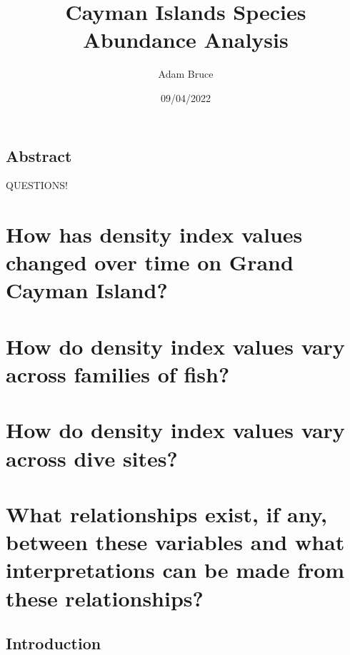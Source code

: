 \documentclass[
]{article}
\title{Cayman Islands Species Abundance Analysis}
\author{Adam Bruce}
\date{09/04/2022}
\begin{document}
\maketitle

\hypertarget{abstract}{%
\subsection{Abstract}\label{abstract}}

QUESTIONS!

\hypertarget{how-has-density-index-values-changed-over-time-on-grand-cayman-island}{%
\section{How has density index values changed over time on Grand Cayman
Island?}\label{how-has-density-index-values-changed-over-time-on-grand-cayman-island}}

\hypertarget{how-do-density-index-values-vary-across-families-of-fish}{%
\section{How do density index values vary across families of
fish?}\label{how-do-density-index-values-vary-across-families-of-fish}}

\hypertarget{how-do-density-index-values-vary-across-dive-sites}{%
\section{How do density index values vary across dive
sites?}\label{how-do-density-index-values-vary-across-dive-sites}}

\hypertarget{what-relationships-exist-if-any-between-these-variables-and-what-interpretations-can-be-made-from-these-relationships}{%
\section{What relationships exist, if any, between these variables and
what interpretations can be made from these
relationships?}\label{what-relationships-exist-if-any-between-these-variables-and-what-interpretations-can-be-made-from-these-relationships}}

\newpage

\hypertarget{introduction}{%
\subsection{Introduction}\label{introduction}}
\end{document}
